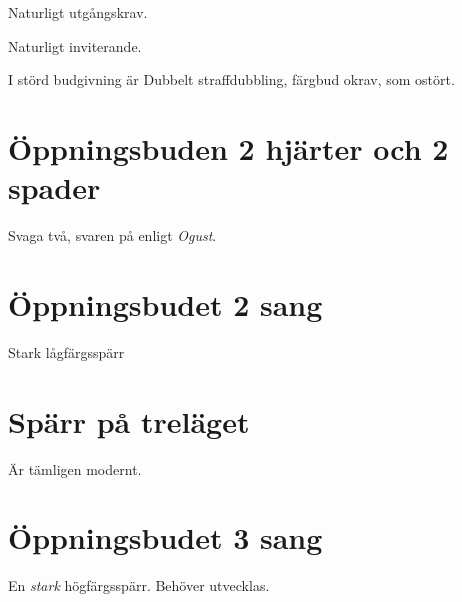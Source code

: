 \item[--\ru{3}] Naturligt utgångskrav.
\item[--\ho{3}, \kl{4}] Naturligt inviterande.
\ebe

I störd budgivning
är Dubbelt straffdubbling, färgbud okrav,  som ostört.

\section{\"Oppningsbuden 2 hjärter och 2 spader}

Svaga två, svaren på  enligt \emph{Ogust}.

\section{\"Oppningsbudet 2 sang}

Stark lågfärgsspärr

\section{Spärr på treläget}

Är tämligen modernt.

\section{\"Oppningsbudet 3 sang}

En \emph{stark} högfärgsspärr. Behöver utvecklas.

